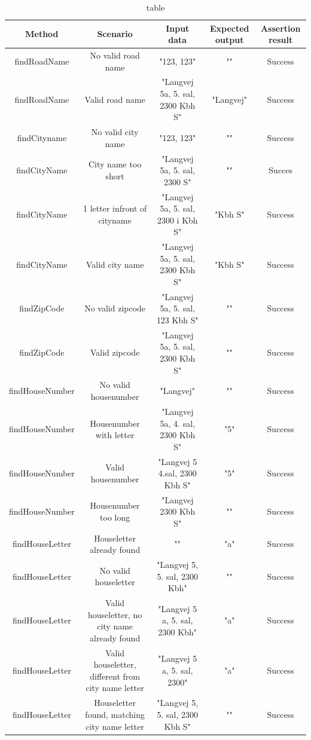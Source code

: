 \documentclass[a4paper,10pt,titlepage]{article}
\begin{document}
\begin{table}
\caption{table}
\centering
\begin{tabular}{c c c c c}
Method & Scenario & Input data & Expected output & Assertion result \\ [0.5ex] 
\hline
findRoadName & No valid road name & "123, 123" & "" & Success\\
findRoadName & Valid road name & "Langvej 5a, 5. sal, 2300 Kbh S" & "Langvej" & Success \\
findCityname & No valid city name & "123, 123" & "" & Success \\
findCityName & City name too short & "Langvej 5a, 5. sal, 2300 S" & "" & Succes\\
findCityName & 1 letter infront of cityname & "Langvej 5a, 5. sal, 2300 i Kbh S" & "Kbh S" & Success \\
findCityName & Valid city name & "Langvej 5a, 5. sal, 2300 Kbh S" & "Kbh S" & Success \\
findZipCode & No valid zipcode & "Langvej 5a, 5. sal, 123 Kbh S" & "" & Success \\
findZipCode & Valid zipcode & "Langvej 5a, 5. sal, 2300 Kbh S" & "" & Success \\
findHouseNumber & No valid housenumber & "Langvej" & "" & Success \\
findHouseNumber &  Housenumber with letter & "Langvej 5a, 4. sal, 2300 Kbh S" & "5" & Success \\
findHouseNumber & Valid housenumber & "Langvej 5 4.sal, 2300 Kbh S" & "5" & Success \\
findHouseNumber & Housenumber too long & "Langvej 2300 Kbh S" & "" & Success \\
findHouseLetter & Houseletter already found & "" & "a" & Success \\
findHouseLetter & No valid houseletter & "Langvej 5, 5. sal, 2300 Kbh" & "" & Success \\
findHouseLetter & Valid houseletter, no city name already found & "Langvej 5 a, 5. sal, 2300 Kbh" & "a" & Success \\
findHouseLetter & Valid houseletter, different from city name letter & "Langvej 5 a, 5. sal, 2300" & "a" & Success \\
findHouseLetter & Houseletter found, matching city name letter & "Langvej 5, 5. sal, 2300 Kbh S" & "" & Success


\end{tabular}
\end{table}
\end{document}
